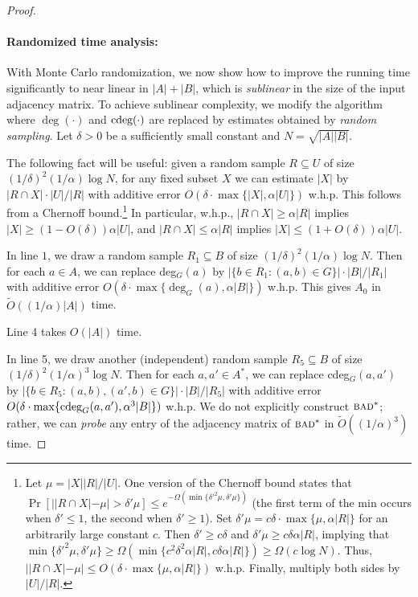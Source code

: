 \documentclass[11pt]{article}
\newcommand{\OO}{\widetilde{O}}
\begin{document}
{\begin{proof}
\paragraph{Randomized time analysis:}
With Monte Carlo randomization, we now show how to improve the running time significantly to near linear in $|A|+|B|$, which is
\emph{sublinear} in the size of the input adjacency matrix.
To achieve sublinear complexity, we modify the algorithm where $\deg(\cdot)$ and $\textrm{cdeg}(\cdot)$
are replaced by estimates obtained by \emph{random sampling}.
Let $\delta>0$ be a sufficiently small constant and $N=\sqrt{|A||B|}$.

The following fact will be useful: given a random sample $R\subseteq U$ of size $(1/\delta)^2(1/\alpha)\log N$, for any fixed subset $X$
we can estimate $|X|$ by $|R\cap X|\cdot |U|/|R|$ with additive error $O(\delta\cdot\max\{|X|,\alpha |U|\})$
w.h.p.  This follows from a Chernoff bound.\footnote{
Let $\mu=|X||R|/|U|$.  One version of the Chernoff bound
states that $\Pr[||R\cap X|-\mu| > \delta'\mu] \le
e^{-\Omega(\min\{\delta'^2\mu,\delta'\mu\})}$
(the first term of the min occurs when $\delta'\le 1$, the second
when $\delta'\ge 1$).  Set $\delta'\mu = c\delta\cdot \max\{\mu,\alpha |R|\}$ for an arbitrarily large constant $c$.  Then $\delta'\ge c\delta$ and $\delta'\mu\ge c\delta\alpha|R|$, implying that $\min\{\delta'^2\mu, \delta'\mu\} \ge \Omega(\min\{c^2\delta^2\alpha|R|, c\delta\alpha|R| \})\ge\Omega(c\log N)$.  Thus,
$||R\cap X| - \mu| \le O(\delta\cdot \max\{\mu,
\alpha|R|\})$ w.h.p.  Finally, multiply both sides by $|U|/|R|$.
}
In particular, w.h.p., $|R\cap X|\ge \alpha |R|$ implies $|X|\ge (1-O(\delta))\alpha |U|$, and $|R\cap X|\le \alpha |R|$ implies
$|X|\le (1+O(\delta))\alpha |U|$.

In line $1$, we draw a random sample $R_1\subseteq B$ of size $(1/\delta)^2(1/\alpha) \log N$.
Then for each $a \in A$, we can replace deg$_G(a)$ by
$|\{b\in R_1: (a,b)\in G\}| \cdot |B|/|R_1|$
with additive error $O(\delta\cdot \max\{\deg_G(a), \alpha|B|\})$ w.h.p.
This gives $A_0$ in $\OO((1/\alpha) |A|)$ time.

Line 4 takes $O(|A|)$ time.

In line 5, we draw another (independent) random sample $R_5\subseteq B$ of size $(1/\delta)^2(1/\alpha)^3 \log N$.
Then for each $a,a' \in A^*$, we can replace cdeg$_G(a,a')$ by
$|\{b\in R_5: (a,b),(a',b)\in G\}| \cdot |B|/|R_5|$
with additive error $O(\delta\cdot \max\{\textrm{cdeg}_G(a,a'), \alpha^3|B|\})$ w.h.p.
We do not explicitly construct $\textsc{bad}^*$; rather, we can \emph{probe} any entry of
the adjacency matrix of $\textsc{bad}^*$ in $\OO((1/\alpha)^3)$ time.


\end{proof}}
\end{document}
